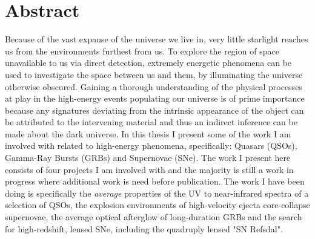 %
\chapter*{Abstract}
\label{sec:abstract}
\vspace*{-10mm}

Because of the vast expanse of the universe we live in, very little starlight reaches us from the environments furthest from us. To explore the region of space unavailable to us via direct detection, extremely energetic phenomena can be used to investigate the space between us and them, by illuminating the universe otherwise obscured. Gaining a thorough understanding of the physical processes at play in the high-energy events populating our universe is of prime importance because any signatures deviating from the intrinsic appearance of the object can be attributed to the intervening material and thus an indirect inference can be made about the dark universe. In this thesis I present some of the work I am involved with related to high-energy phenomena, specifically: Quasars (QSOs), Gamma-Ray Bursts (GRBs) and Supernovae (SNe). The work I present here consists of four projects I am involved with and the majority is still a work in progress where additional work is need before publication. The work I have been doing is specifically the \textit{average} properties of the UV to near-infrared spectra of a selection of QSOs, the explosion environments of high-velocity ejecta core-collapse supernovae, the average optical afterglow of long-duration GRBs and the search for high-redshift, lensed SNe, including the quadruply lensed "SN Refsdal".




